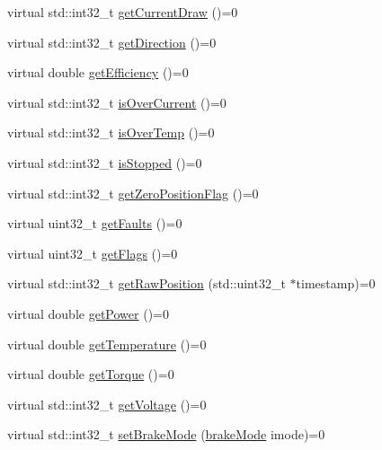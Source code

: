 \begin{DoxyCompactItemize}
\item 
virtual std\+::int32\+\_\+t \mbox{\hyperlink{classokapi_1_1AbstractMotor_a755ad2c78a4b36cc56eef1029a3aa217}{get\+Current\+Draw}} ()=0
\item 
virtual std\+::int32\+\_\+t \mbox{\hyperlink{classokapi_1_1AbstractMotor_a94763d1700bd91b995333b012c0b683f}{get\+Direction}} ()=0
\item 
virtual double \mbox{\hyperlink{classokapi_1_1AbstractMotor_a27a6e3ec007619a9b91f9d6ebc61e613}{get\+Efficiency}} ()=0
\item 
virtual std\+::int32\+\_\+t \mbox{\hyperlink{classokapi_1_1AbstractMotor_a3d365496ebb8566c0a12611f090c5231}{is\+Over\+Current}} ()=0
\item 
virtual std\+::int32\+\_\+t \mbox{\hyperlink{classokapi_1_1AbstractMotor_a61e24db43d1fe790b173cc0b4e27922f}{is\+Over\+Temp}} ()=0
\item 
virtual std\+::int32\+\_\+t \mbox{\hyperlink{classokapi_1_1AbstractMotor_aa46c96a6eec7921ad5b12fcd4119358e}{is\+Stopped}} ()=0
\item 
virtual std\+::int32\+\_\+t \mbox{\hyperlink{classokapi_1_1AbstractMotor_a07079ee87a07b98b7008f2ce91c645ea}{get\+Zero\+Position\+Flag}} ()=0
\item 
virtual uint32\+\_\+t \mbox{\hyperlink{classokapi_1_1AbstractMotor_ae741463ec8de88c4f7ba854b5d6d7bce}{get\+Faults}} ()=0
\item 
virtual uint32\+\_\+t \mbox{\hyperlink{classokapi_1_1AbstractMotor_aaae44487bf20ac2e18b52ee57b7a06ad}{get\+Flags}} ()=0
\item 
virtual std\+::int32\+\_\+t \mbox{\hyperlink{classokapi_1_1AbstractMotor_aa34fefa954fbff26e3d68e59c4f10964}{get\+Raw\+Position}} (std\+::uint32\+\_\+t $\ast$timestamp)=0
\item 
virtual double \mbox{\hyperlink{classokapi_1_1AbstractMotor_aed423ac40cec85c5880f7954b6d810fe}{get\+Power}} ()=0
\item 
virtual double \mbox{\hyperlink{classokapi_1_1AbstractMotor_a96ef2dc7eeb1ac23713e3e37af9e95f2}{get\+Temperature}} ()=0
\item 
virtual double \mbox{\hyperlink{classokapi_1_1AbstractMotor_a955818baa689b279b36dda6a74f15d4e}{get\+Torque}} ()=0
\item 
virtual std\+::int32\+\_\+t \mbox{\hyperlink{classokapi_1_1AbstractMotor_a855b35b508e90074f21662b06ad2a0c8}{get\+Voltage}} ()=0
\item 
virtual std\+::int32\+\_\+t \mbox{\hyperlink{classokapi_1_1AbstractMotor_af7bb7d0d895c89d6b193f500587a818b}{set\+Brake\+Mode}} (\mbox{\hyperlink{classokapi_1_1AbstractMotor_a132e0485dbb59a60c3f934338d8fa601}{brake\+Mode}} imode)=0

\end{DoxyCompactItemize}

